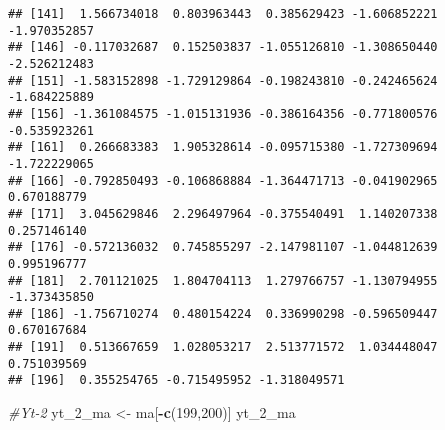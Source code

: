 \documentclass[
]{article}
\newenvironment{Shaded}{\begin{snugshade}}{\end{snugshade}}
\newcommand{\CommentTok}[1]{\textcolor[rgb]{0.56,0.35,0.01}{\textit{#1}}}
\newcommand{\DecValTok}[1]{\textcolor[rgb]{0.00,0.00,0.81}{#1}}
\newcommand{\FunctionTok}[1]{\textcolor[rgb]{0.13,0.29,0.53}{\textbf{#1}}}
\newcommand{\NormalTok}[1]{#1}
\newcommand{\OtherTok}[1]{\textcolor[rgb]{0.56,0.35,0.01}{#1}}
\newcommand{\SpecialCharTok}[1]{\textcolor[rgb]{0.81,0.36,0.00}{\textbf{#1}}}
\begin{document}
\begin{verbatim}
## [141]  1.566734018  0.803963443  0.385629423 -1.606852221 -1.970352857
## [146] -0.117032687  0.152503837 -1.055126810 -1.308650440 -2.526212483
## [151] -1.583152898 -1.729129864 -0.198243810 -0.242465624 -1.684225889
## [156] -1.361084575 -1.015131936 -0.386164356 -0.771800576 -0.535923261
## [161]  0.266683383  1.905328614 -0.095715380 -1.727309694 -1.722229065
## [166] -0.792850493 -0.106868884 -1.364471713 -0.041902965  0.670188779
## [171]  3.045629846  2.296497964 -0.375540491  1.140207338  0.257146140
## [176] -0.572136032  0.745855297 -2.147981107 -1.044812639  0.995196777
## [181]  2.701121025  1.804704113  1.279766757 -1.130794955 -1.373435850
## [186] -1.756710274  0.480154224  0.336990298 -0.596509447  0.670167684
## [191]  0.513667659  1.028053217  2.513771572  1.034448047  0.751039569
## [196]  0.355254765 -0.715495952 -1.318049571
\end{verbatim}

\begin{Shaded}
\begin{Highlighting}[]
\CommentTok{\#Yt{-}2}
\NormalTok{yt\_2\_ma }\OtherTok{\textless{}{-}}\NormalTok{ ma[}\SpecialCharTok{{-}}\FunctionTok{c}\NormalTok{(}\DecValTok{199}\NormalTok{,}\DecValTok{200}\NormalTok{)]}
\NormalTok{yt\_2\_ma}
\end{Highlighting}
\end{Shaded}
\end{document}

